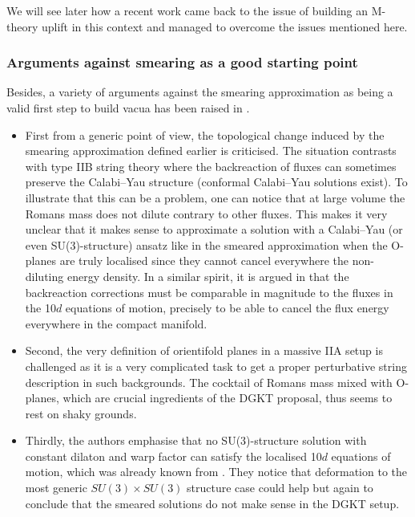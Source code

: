 \documentclass[11pt, a4paper]{article}
\begin{document}
We will see later how a recent work \cite{Cribiori:2021djm} came back to the issue of building an M-theory uplift in this context and managed to overcome the issues mentioned here.

\subsubsection{Arguments against smearing as a good starting point}
\label{sec:against_smearing}

Besides, a variety of arguments against the smearing approximation as being a valid first step to build vacua has been raised in \cite{McOrist:2012yc}. 
\begin{itemize}
\item First from a generic point of view, the topological change induced by the smearing approximation defined earlier is criticised. The situation contrasts with type IIB string theory where the backreaction of fluxes can sometimes preserve the Calabi--Yau structure (conformal Calabi--Yau solutions exist). To illustrate that this can be a problem, one can notice that at large volume the Romans mass does not dilute contrary to other fluxes. This makes it very unclear that it makes sense to approximate a solution with a Calabi--Yau (or even SU(3)-structure) ansatz like in the smeared approximation when the O-planes are truly localised since they cannot cancel everywhere the non-diluting energy density. In a similar spirit, it is argued in \cite{Douglas:2010rt} that the backreaction corrections must be comparable in magnitude to the fluxes in the 10$d$ equations of motion, precisely to be able to cancel the flux energy everywhere in the compact manifold.
\item  Second, the very definition of orientifold planes in a massive IIA setup is challenged as it is a very complicated task to get a proper perturbative string description in such backgrounds. The cocktail of Romans mass mixed with O-planes, which are crucial ingredients of the DGKT proposal, thus seems to rest on shaky grounds. 
\item Thirdly, the authors emphasise that no SU(3)-structure solution with constant dilaton and warp factor can satisfy the localised 10$d$ equations of motion, which was already known from \cite{Acharya:2006ne}. They notice that deformation to the most generic $SU(3)\times SU(3)$ structure case could help but again to conclude that the smeared solutions do not make sense in the DGKT setup.
\end{itemize} 
\end{document}
